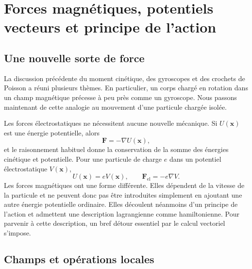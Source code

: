 \chapter{Forces magnétiques, potentiels vecteurs et principe de l’action}


\section{Une nouvelle sorte de force}

La discussion précédente du moment cinétique, des gyroscopes et des crochets de Poisson a réuni plusieurs thèmes. En particulier, un corps chargé en rotation dans un champ magnétique précesse à peu près comme un gyroscope. Nous passons maintenant de cette analogie au mouvement d’une particule chargée isolée.

Les forces électrostatiques ne nécessitent aucune nouvelle mécanique. Si \(U(\mathbf x)\) est une énergie potentielle, alors
\begin{equation}
  \mathbf F=-\nabla U(\mathbf x),
\end{equation}
et le raisonnement habituel donne la conservation de la somme des énergies cinétique et potentielle. Pour une particule de charge \(e\) dans un potentiel électrostatique \(V(\mathbf x)\),
\begin{equation}
  U(\mathbf x)=eV(\mathbf x),
  \qquad
  \mathbf F_{\mathrm{el}}=-e\nabla V.
\end{equation}
Les forces magnétiques ont une forme différente. Elles dépendent de la vitesse de la particule et ne peuvent donc pas être introduites simplement en ajoutant une autre énergie potentielle ordinaire. Elles découlent néanmoins d’un principe de l’action et admettent une description lagrangienne comme hamiltonienne. Pour parvenir à cette description, un bref détour essentiel par le calcul vectoriel s’impose.

\section{Champs et opérations locales}

